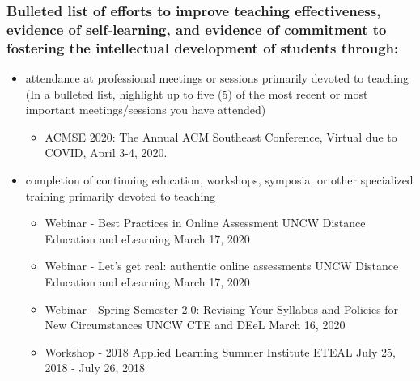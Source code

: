 \documentclass[10pt]{article}
\begin{document}
\subsubsection{Bulleted list of efforts to improve teaching effectiveness, evidence of self-learning, and evidence of commitment to fostering the intellectual development of students through:}

\begin{itemize}
    \item attendance at professional meetings or sessions primarily devoted to teaching (In a bulleted list, highlight up to five (5) of the most recent or most important meetings/sessions you have attended)
    \begin{itemize}
        \item ACMSE 2020: The Annual ACM Southeast Conference, Virtual due to COVID, April 3-4, 2020.
    \end{itemize}
    \item completion of continuing education, workshops, symposia, or other specialized training primarily devoted to teaching
    \begin{itemize}
        \item Webinar - Best Practices in Online Assessment UNCW Distance Education and eLearning March 17, 2020
        \item Webinar - Let's get real: authentic online assessments UNCW Distance Education and eLearning March 17, 2020
        \item Webinar - Spring Semester 2.0: Revising Your Syllabus and Policies for New Circumstances UNCW CTE and DEeL March 16, 2020
        \item Workshop - 2018 Applied Learning Summer Institute ETEAL July 25, 2018 - July 26, 2018
\end{itemize}
\end{itemize}
\end{document}
